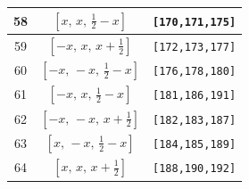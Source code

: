 \documentclass[fleqn,8pt]{jsarticle}
\begin{document}
\begin{longtable}{ccc}
58 & $\left[ x,\, x,\, \frac{1}{2} - x \right]$ & {\tt [170,171,175]} \\ \hline
59 & $\left[ - x,\, x,\, x + \frac{1}{2} \right]$ & {\tt [172,173,177]} \\ \hline
60 & $\left[ - x,\, - x,\, \frac{1}{2} - x \right]$ & {\tt [176,178,180]} \\ \hline
61 & $\left[ - x,\, x,\, \frac{1}{2} - x \right]$ & {\tt [181,186,191]} \\ \hline
62 & $\left[ - x,\, - x,\, x + \frac{1}{2} \right]$ & {\tt [182,183,187]} \\ \hline
63 & $\left[ x,\, - x,\, \frac{1}{2} - x \right]$ & {\tt [184,185,189]} \\ \hline
64 & $\left[ x,\, x,\, x + \frac{1}{2} \right]$ & {\tt [188,190,192]} \\
\end{longtable}
\renewcommand{\arraystretch}{1.2}
\end{document}
